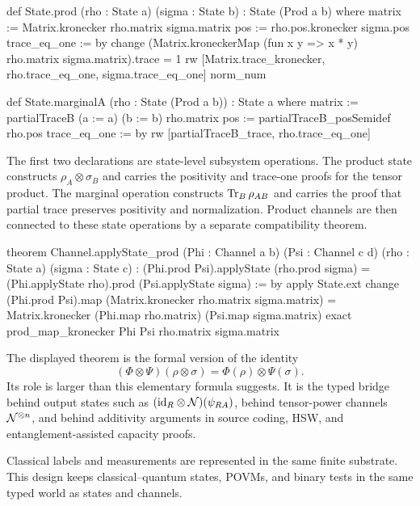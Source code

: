 \documentclass[10pt,a4paper]{article}
\begin{document}
\begin{qitleancode}[title={Product states and marginals}]
def State.prod (rho : State a) (sigma : State b) : State (Prod a b) where
  matrix := Matrix.kronecker rho.matrix sigma.matrix
  pos := rho.pos.kronecker sigma.pos
  trace_eq_one := by
    change (Matrix.kroneckerMap (fun x y => x * y) rho.matrix sigma.matrix).trace = 1
    rw [Matrix.trace_kronecker, rho.trace_eq_one, sigma.trace_eq_one]
    norm_num

def State.marginalA (rho : State (Prod a b)) : State a where
  matrix := partialTraceB (a := a) (b := b) rho.matrix
  pos := partialTraceB_posSemidef rho.pos
  trace_eq_one := by
    rw [partialTraceB_trace, rho.trace_eq_one]
\end{qitleancode}
	
The first two declarations are state-level subsystem operations.  The product
state constructs $\rho_A\otimes\sigma_B$ and carries the positivity and
trace-one proofs for the tensor product.  The marginal operation constructs
$\operatorname{Tr}_B\rho_{AB}$ and carries the proof that partial trace preserves
positivity and normalization.  Product channels are then connected to these
state operations by a separate compatibility theorem.

\begin{qitleancode}[title={Product-channel action}]
theorem Channel.applyState_prod (Phi : Channel a b) (Psi : Channel c d)
    (rho : State a) (sigma : State c) :
    (Phi.prod Psi).applyState (rho.prod sigma) =
      (Phi.applyState rho).prod (Psi.applyState sigma) := by
  apply State.ext
  change (Phi.prod Psi).map (Matrix.kronecker rho.matrix sigma.matrix) =
    Matrix.kronecker (Phi.map rho.matrix) (Psi.map sigma.matrix)
  exact prod_map_kronecker Phi Psi rho.matrix sigma.matrix
\end{qitleancode}
	
The displayed theorem is the formal version of the identity
\begin{equation}
    (\Phi\otimes\Psi)(\rho\otimes\sigma)
    =
    \Phi(\rho)\otimes\Psi(\sigma).
\end{equation}
Its role is larger than this elementary formula suggests.  It is the typed
bridge behind output states such as $({\operatorname{id}}_R\otimes{\cal N})(\psi_{RA})$, behind
tensor-power channels ${\cal N}^{\otimes n}$, and behind additivity arguments in
source coding, HSW, and entanglement-assisted capacity proofs.

Classical labels and measurements are represented in the same finite
substrate. This design keeps classical--quantum states, POVMs, and binary tests in the same typed world as states and channels.
	
\end{document}
